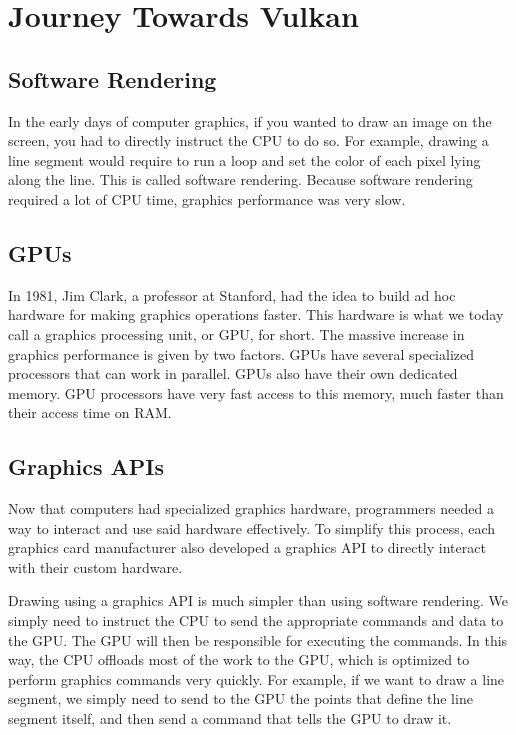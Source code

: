 \chapter{Journey Towards Vulkan}
\label{chap:Vulkan}

\section{Software Rendering}

In the early days of computer graphics, if you wanted to draw an image on the
screen, you had to directly instruct the CPU to do so.
For example, drawing a line segment would require to run a loop and set the
color of each pixel lying along the line.
This is called software rendering.
Because software rendering required a lot of CPU time, graphics performance
was very slow.

\section{GPUs}

In 1981, Jim Clark, a professor at Stanford, had the idea to build
ad hoc hardware for making graphics operations faster.
This hardware is what we today call a graphics processing unit, or
GPU, for short.
The massive increase in graphics performance is given by two factors.
GPUs have several specialized processors that can work in parallel.
GPUs also have their own dedicated memory.
GPU processors have very fast access to this memory, much faster than
their access time on RAM.

\section{Graphics APIs}

Now that computers had specialized graphics hardware, programmers
needed a way to interact and use said hardware effectively.
To simplify this process, each graphics card manufacturer also developed
a graphics API to directly interact with their custom hardware.

Drawing using a graphics API is much simpler than using software rendering.
We simply need to instruct the CPU to send the appropriate commands and data
to the GPU.
The GPU will then be responsible for executing the commands.
In this way, the CPU offloads most of the work to the GPU, which is optimized
to perform graphics commands very quickly.
For example, if we want to draw a line segment, we simply need to send to the
GPU the points that define the line segment itself, and then send a
command that tells the GPU to draw it.

